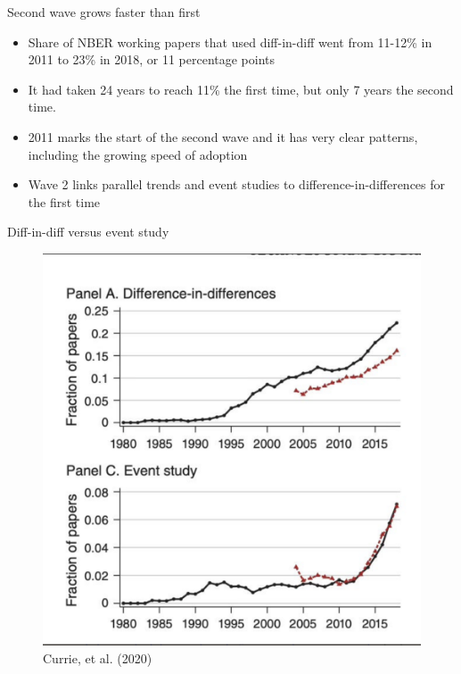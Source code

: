 \documentclass{beamer}
\begin{document}
\begin{frame}{Second wave grows faster than first}

\begin{itemize}
\item Share of NBER working papers that used diff-in-diff went from 11-12\% in 2011 to 23\% in 2018, or 11 percentage points
\item It had taken 24 years to reach 11\% the first time, but only 7 years the second time. 
\item 2011 marks the start of the second wave and it has very clear patterns, including the growing speed of adoption
\item Wave 2 links parallel trends and event studies to difference-in-differences for the first time
\end{itemize}

\end{frame}

\begin{frame}{Diff-in-diff versus event study}

	\begin{figure}
	\caption{Currie, et al. (2020)}
	\includegraphics[scale=0.25]{./lecture_includes/secondwave.png}
	\end{figure}


\end{frame}
\end{document}
